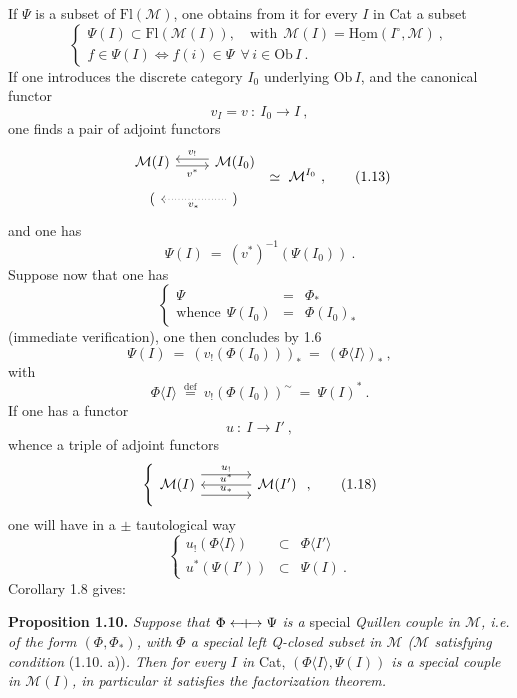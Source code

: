 \documentclass[11pt]{article}
\newcommand{\printedpage}[1]{\marginpar{\footnotesize p.~#1}}
\newcommand{\msp}[1]{\marginpar{\footnotesize [#1]}}
\newcommand{\Qcouple}{\mathrel{\leftarrow\mkern-9mu{+}\mkern-9mu\rightarrow}}
\newcommand{\fl}{\longrightarrow}
\begin{document}
\msp{page 10}
If $\Psi$ is a subset of $\mathrm{Fl}(\mathcal{M})$, one obtains from it for every $I$ in Cat a subset
\[
\left\{
\begin{array}{l}
\Psi(I) \subset \mathrm{Fl}(\mathcal{M}(I)), \quad \text{with}\ \ \mathcal{M}(I) = \underline{\mathrm{Hom}}(I^{\circ}, \mathcal{M})\ , \\[1ex]
f \in \Psi(I) \iff f(i) \in \Psi \ \ \forall\, i \in \mathrm{Ob}\, I\ .
\end{array}
\right.
\tag*{(1.11)}
\]
If one introduces the discrete category $I_0$ underlying $\mathrm{Ob}\, I$, and the canonical functor
\[
v_I = v \ :\ I_0 \fl I\ , \tag*{(1.12)}
\]
one finds a pair of adjoint functors
\[
\begin{tikzcd}[row sep=small]
\mathcal{M}(I) \arrow[r, shift right=1, "v^{*}"'] & \mathcal{M}(I_0) \arrow[l, shift right=1, "v_{!}"'] \\
( & ) \arrow[l, dotted, "v_{*}"]
\end{tikzcd}
\ \simeq\ \mathcal{M}^{I_0}\ ,
\tag*{(1.13)}
\]
and one has
\[
\Psi(I) \ =\ (v^{*})^{-1}(\Psi(I_0))\ .
\]
Suppose now that one has
\[
\left\{
\begin{array}{rcl}
\Psi & = & \Phi_{*} \\[1ex]
\text{whence}\ \ \Psi(I_0) & = & \Phi(I_0)_{*}
\end{array}
\right.
\tag*{(1.14)}
\]
(immediate verification), one then concludes by 1.6
\[
\Psi(I) \ =\ (v_{!}(\Phi(I_0)))_{*} \ =\ (\Phi\langle I\rangle)_{*}\ , \tag*{(1.15)}
\]
with
\[
\Phi\langle I\rangle \ \overset{\text{def}}{=}\ v_{!}(\Phi(I_0))^{\sim} \ =\ \Psi(I)^{*}\ . \tag*{(1.16)}
\]
If one has a functor
\[
u \ :\ I \fl I'\ , \tag*{(1.17)}
\]
whence a triple of adjoint functors
\printedpage{7}
\msp{page 11}
\[
\left\{
\begin{tikzcd}[column sep=large]
\mathcal{M}(I) \arrow[r, shift left=3, "u_{!}"] \arrow[r, shift right=3, "u_{*}"] & \mathcal{M}(I') \arrow[l, "u^{*}"']
\end{tikzcd}
\right.
,
\tag*{(1.18)}
\]
one will have in a $\pm$ tautological way
\[
\left\{
\begin{array}{rcl}
u_{!}(\Phi\langle I\rangle) & \subset & \Phi\langle I'\rangle \\
u^{*}(\Psi(I')) & \subset & \Psi(I)\ .
\end{array}
\right.
\tag*{(1.19)}
\]
Corollary 1.8 gives:

\textbf{Proposition 1.10.} \textit{Suppose that $\Phi \Qcouple \Psi$ is a} special \textit{Quillen couple in $\mathcal{M}$, i.e. of the form $(\Phi, \Phi_{*})$, with $\Phi$ a special left Q-closed subset in $\mathcal{M}$ ($\mathcal{M}$ satisfying condition} (1.10. a))\textit{. Then for every $I$ in} Cat, \textit{$(\Phi\langle I\rangle, \Psi(I))$ is a special couple in $\mathcal{M}(I)$, in particular it satisfies the factorization theorem.}
\end{document}
